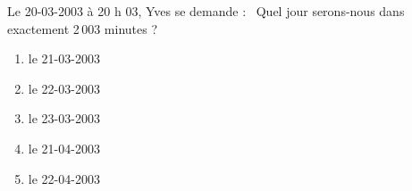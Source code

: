 Le 20-03-2003 à 20 h 03, Yves se demande :
\og\ Quel jour serons-nous dans exactement 2\,003 minutes ?\fg
\begin{multicols}{5}
  \begin{enumerate}[A/]
  \item le 21-03-2003
  \item le 22-03-2003
  \item le 23-03-2003
  \item le 21-04-2003
  \item le 22-04-2003
  \end{enumerate}
\end{multicols}
